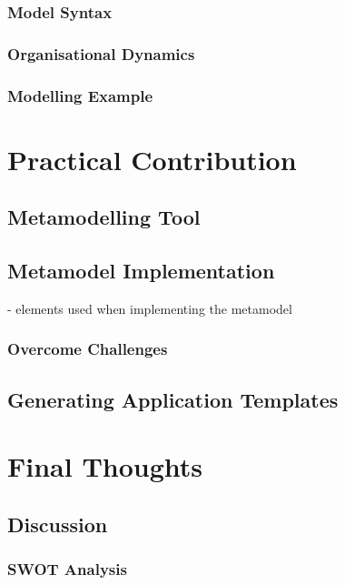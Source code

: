\documentclass[12pt,a4paper,draft]{report}
\begin{document}
\subsection{Model Syntax}


\subsection{Organisational Dynamics}


\subsection{Modelling Example}

\clearpage
\chapter{Practical Contribution}

\section{Metamodelling Tool}

\section{Metamodel Implementation}

- elements used when implementing the metamodel

\subsection{Overcome Challenges}

\section{Generating Application Templates}

\clearpage
\chapter{Final Thoughts}



\section{Discussion}

\subsection{SWOT Analysis}
\end{document}
